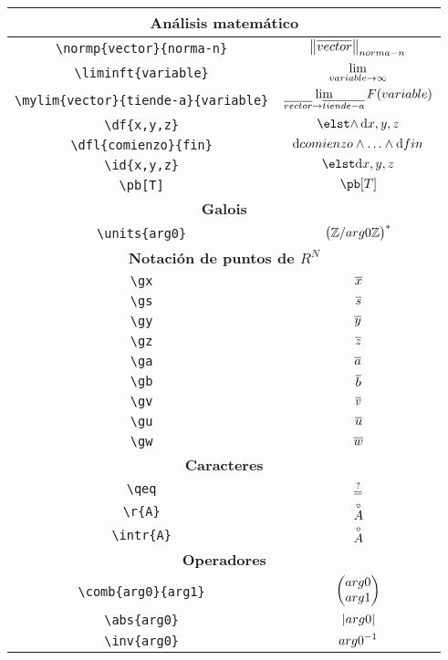 \begin{longtable}{|c|c|}
\multicolumn{2}{|c|}{\textbf{Análisis matemático}} \\ \hline 
\verb|\normp{vector}{norma-n}| & $\displaystyle\norm{\overline{vector}}_{norma-n}$ \\ \hline 
\verb|\liminft{variable}| & $\displaystyle\lim_{{variable}\rightarrow \infty}$ \\ \hline 
\verb|\mylim{vector}{tiende-a}{variable}| & $\displaystyle\lim_{\overline{vector} \rightarrow \overline{tiende-a}} F({variable})$ \\ \hline 
\verb|\df{x,y,z}| & $\displaystyle\df{x,y,z}$ \\ \hline 
\verb|\dfl{comienzo}{fin}| & $\displaystyle\operatorname{d\!}{} comienzo \wedge \dotsc \wedge \operatorname{d\!}{} fin$ \\ \hline 
\verb|\id{x,y,z}| & $\displaystyle\id{x,y,z}$ \\ \hline 
\verb|\pb[T]| & $\displaystyle\pb[T]$ \\ \hline 
\multicolumn{2}{|c|}{\textbf{Galois}} \\ \hline 
\verb|\units{arg0}| & $\displaystyle\left(\mathbb{Z}/{arg0}\mathbb{Z}\right)^*$ \\ \hline 
\multicolumn{2}{|c|}{\textbf{Notación de puntos de $R^N$}} \\ \hline 
\verb|\gx| & $\displaystyle\overline{x}$ \\ \hline 
\verb|\gs| & $\displaystyle\overline{s}$ \\ \hline 
\verb|\gy| & $\displaystyle\overline{y}$ \\ \hline 
\verb|\gz| & $\displaystyle\overline{z}$ \\ \hline 
\verb|\ga| & $\displaystyle\overline{a}$ \\ \hline 
\verb|\gb| & $\displaystyle\overline{b}$ \\ \hline 
\verb|\gv| & $\displaystyle\overline{v}$ \\ \hline 
\verb|\gu| & $\displaystyle\overline{u}$ \\ \hline 
\verb|\gw| & $\displaystyle\overline{w}$ \\ \hline 
\multicolumn{2}{|c|}{\textbf{Caracteres}} \\ \hline 
\verb|\qeq| & $\displaystyle\overset{?}{=}$ \\ \hline 
\verb|\r{A}| & $\displaystyle\overset{\circ}{A}$ \\ \hline 
\verb|\intr{A}| & $\displaystyle\overset{\circ}{A}$ \\ \hline 
\multicolumn{2}{|c|}{\textbf{Operadores}} \\ \hline 
\verb|\comb{arg0}{arg1}| & $\displaystyle\left( \begin{matrix} arg0 \\ arg1 \end{matrix} \right)$ \\ \hline 
\verb|\abs{arg0}| & $\displaystyle\left\vert arg0 \right\vert$ \\ \hline 
\verb|\inv{arg0}| & $\displaystyle{arg0}^{-1}$ \\ \hline 

\end{longtable}
